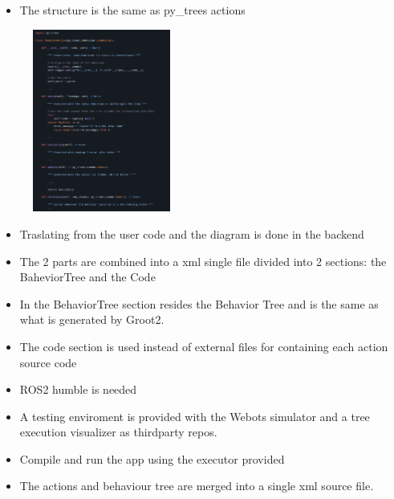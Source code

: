 \documentclass[notes,slidesec,a4]{seminar}
\begin{document}
\begin{hslide}
\newpage
  \begin{itemize}
  \item The structure is the same as py\_trees actions
  \end{itemize}
 \begin{figure}
    \centerline{\includegraphics[height=6cm]{figs/screenshot4.png}}
 \end{figure}
 
\newpage
 \begin{itemize}
 	\item Traslating from the user code and the diagram is done in the backend
 	\item The 2 parts are combined into a xml single file divided into 2 sections: the BaheviorTree and the Code
 	\item In the BehaviorTree section resides the Behavior Tree and is the same as what is generated by Groot2.
 	\item The code section is used instead of external files for containing each action source code
 \end{itemize}
 
 \newpage
 \begin{itemize}
 \item ROS2 humble is needed
 \item A testing enviroment is provided with the Webots simulator and a tree execution visualizer as thirdparty repos.
 \item Compile and run the app using the executor provided
 \item The actions and behaviour tree are merged into a single xml source file.
 \end{itemize}


\end{hslide}
\end{document}
